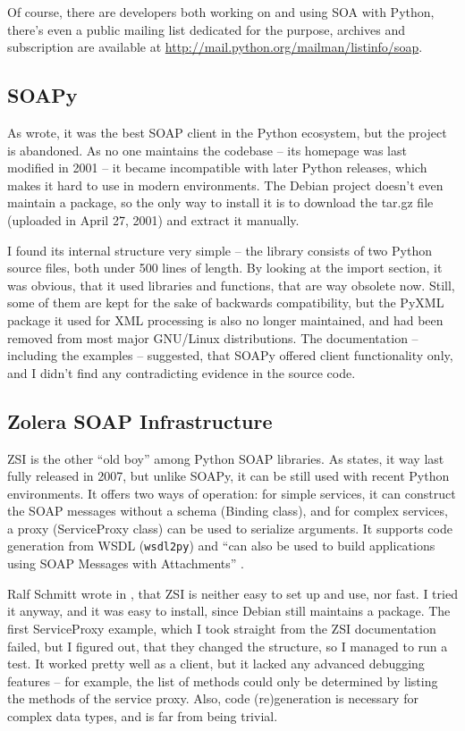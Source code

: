 Of course, there are developers both working on and using SOA with Python, there's even a public mailing list dedicated for the purpose, archives and subscription are available at \url{http://mail.python.org/mailman/listinfo/soap}.

\subsection{SOAPy}

As \cite{so-206154} wrote, it was the best SOAP client in the Python ecosystem, but the project is abandoned. As no one maintains the codebase -- its homepage was last modified in 2001 -- it became incompatible with later Python releases, which makes it hard to use in modern environments. The Debian project doesn't even maintain a package, so the only way to install it is to download the tar.gz file (uploaded in April 27, 2001) and extract it manually.

I found its internal structure very simple -- the library consists of two Python source files, both under 500 lines of length. By looking at the import section, it was obvious, that it used libraries and functions, that are way obsolete now. Still, some of them are kept for the sake of backwards compatibility, but the PyXML package it used for XML processing is also no longer maintained, and had been removed from most major GNU/Linux distributions. The documentation -- including the examples -- suggested, that SOAPy offered client functionality only, and I didn't find any contradicting evidence in the source code.

\subsection{Zolera SOAP Infrastructure}
\label{ZSI}

ZSI is the other ``old boy'' among Python SOAP libraries. As \cite{pywebsvcs-talk} states, it way last fully released in 2007, but unlike SOAPy, it can be still used with recent Python environments. It offers two ways of operation: for simple services, it can construct the SOAP messages without a schema (Binding class), and for complex services, a proxy (ServiceProxy class) can be used to serialize arguments. It supports code generation from WSDL (\verb|wsdl2py|) and ``can also be used to build applications using SOAP Messages with Attachments'' \cite{zsi-doc}.

Ralf Schmitt wrote in \cite{zsi-velocity}, that ZSI is neither easy to set up and use, nor fast. I tried it anyway, and it was easy to install, since Debian still maintains a package. The first ServiceProxy example, which I took straight from the ZSI documentation failed, but I figured out, that they changed the structure, so I managed to run a test. It worked pretty well as a client, but it lacked any advanced debugging features -- for example, the list of methods could only be determined by listing the methods of the service proxy. Also, code (re)generation is necessary for complex data types, and is far from being trivial.

